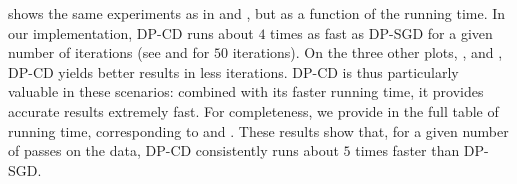  shows the same experiments as in
 and , but as a
function of the running time. In our implementation, DP-CD runs about
$4$ times as fast as DP-SGD for a given number of iterations (see
 and
 for $50$ iterations). On the three
other plots, ,
 and ,
DP-CD yields better results in less iterations. DP-CD is thus
particularly valuable in these scenarios: combined with its faster
running time, it provides accurate results extremely fast.  For
completeness, we provide in  the full
table of running time, corresponding to
 and . These
results show that, for a given number of passes on the data, DP-CD
consistently runs about $5$ times faster than DP-SGD.


